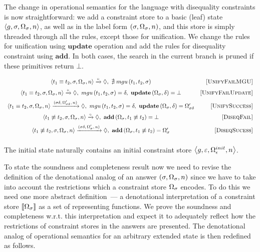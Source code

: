 The change in operational semantics for the language with disequality constraints is now straightforward: we add a constraint store to a basic (leaf) state $\left<{g, \sigma, \Omega_\sigma, n}\right>$,
as well as in the label form $(\sigma, \Omega_\sigma, n)$, and this store is simply threaded through all the rules, except those for unification. We change the rules
for unification using $\mathbf{update}$ operation and add the rules for disequality constraint using $\mathbf{add}$. In both cases, the search in the current branch is
pruned if these primitives return $\bot$.

 \[
  \begin{array}{cr}
    \left<{t_1 \equiv t_2, \sigma, \Omega_\sigma, n}\right> \xrightarrow{\circ} \Diamond , \, \, \nexists\; mgu\,(t_1, t_2, \sigma) &\mbox{[\textsc{UnifyFailMGU}]} \\[2mm]
    \left<{t_1 \equiv t_2, \sigma, \Omega_\sigma, n}\right> \xrightarrow{\circ} \Diamond , \, \, mgu\,(t_1, t_2, \sigma) = \delta, \, \, \mathbf{update}\,(\Omega_\sigma, \delta) = \bot &\mbox{[\textsc{UnifyFailUpdate}]} \\[2mm]
    \left<{t_1 \equiv t_2, \sigma, \Omega_\sigma, n}\right> \xrightarrow{(\sigma \delta, \, \Omega'_{\sigma\delta}, \, n)} \Diamond , \, \, mgu\,(t_1, t_2, \sigma) = \delta, \, \, \mathbf{update}\,(\Omega_\sigma, \delta) = \Omega'_{\sigma\delta} & \mbox{[\textsc{UnifySuccess}]} \\[2mm]
    \left<{t_1 \not\equiv t_2, \sigma, \Omega_\sigma, n}\right> \xrightarrow{\circ} \Diamond , \, \, \mathbf{add}\,(\Omega_\sigma, t_1 \not\equiv t_2) = \bot &\mbox{[\textsc{DiseqFail}]} \\[2mm]
    \left<{t_1 \not\equiv t_2, \sigma, \Omega_\sigma, n}\right> \xrightarrow{(\sigma \delta, \, \Omega'_{\sigma}, \, n)} \Diamond , \, \, \mathbf{add}\,(\Omega_\sigma, t_1 \not\equiv t_2) = \Omega'_\sigma &\mbox{[\textsc{DiseqSucess}]} \\[2mm]
  \end{array}
\]

The initial state naturally contains an initial constraint store $\left<{g, \varepsilon, \Omega_\epsilon^{init}, n}\right>$.

To state the soundness and completeness result now we need to revise the definition of the denotational analog of an answer $(\sigma, \Omega_\sigma, n)$
since we have to take into account the restrictions which a constraint store $\Omega_\sigma$ encodes.
To do this we need one more abstract definition~--- a denotational interpretation of a constraint store $\llbracket{\Omega_\sigma}\rrbracket$ as a set of representing functions.
We prove the soundness and completeness w.r.t. this interpretation and expect it to adequately reflect how the restrictions of constraint stores in the answers are presented.
The denotational analog of operational semantics for an arbitrary extended state is then redefined as follows.

